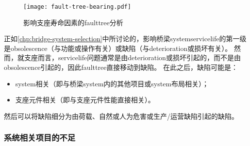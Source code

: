 \begin{figure}
  \texttt{[image: fault-tree-bearing.pdf]}
  \caption{影响支座寿命因素的\gls*{faulttree}分析}
  \label{fig:fault-tree-bearing}
\end{figure}

正如\cref{chp:bridge-system-selection}中所讨论的，影响桥梁\gls*{system}\gls*{servicelife}的第一级是\gls*{obsolescence}（与功能或操作有关）或缺陷（与\gls*{deterioration}或损坏有关）。 然而，就支座而言，\gls*{servicelife}问题通常是由\gls*{deterioration}或损坏引起的，而不是由\gls*{obsolescence}引起的，因此\gls*{faulttree}直接移动到缺陷。 在此之后，缺陷可能是：

\begin{itemize}
  \item \gls*{system}相关（即与桥梁\gls*{system}内的其他项目或\gls*{system}布局相关）；
  \item 支座元件相关（即与支座元件性能直接相关）。
\end{itemize}

然后可以将缺陷细分为由荷载、自然或人为危害或生产/运营缺陷引起的缺陷。

\subsubsection{系统相关项目的不足}

